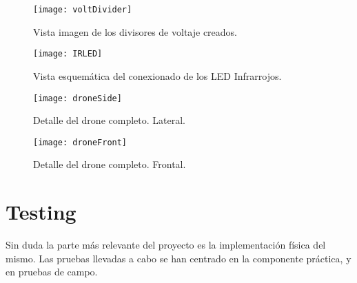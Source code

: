 \begin{figure}[H]
	\centering
	\texttt{[image: voltDivider]}
	\caption[Divisor de voltaje]{Vista imagen de los divisores de voltaje creados.}\label{fig:imgVoltDiv}
\end{figure}

\begin{figure}[H]
	\centering
	\texttt{[image: IRLED]}
	\caption[LED IR]{Vista esquemática del conexionado de los LED Infrarrojos.}\label{fig:schIRLED}
\end{figure}

\begin{figure}[H]
	\centering
	\texttt{[image: droneSide]}
	\caption[Lateral del drone]{Detalle del drone completo. Lateral.}\label{fig:droneSideView}
\end{figure}

\begin{figure}[H]
	\centering
	\texttt{[image: droneFront]}
	\caption[Frontal del drone]{Detalle del drone completo. Frontal.}\label{fig:droneFrontView}
\end{figure}


\section{Testing}

Sin duda la parte más relevante del proyecto es la implementación física del mismo. Las pruebas llevadas a cabo se han centrado en la componente práctica, y en pruebas de campo. 

